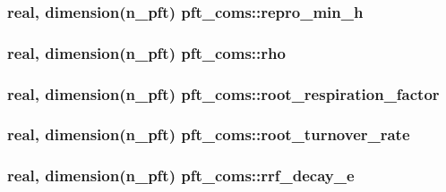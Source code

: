 \subsubsection[{repro\+\_\+min\+\_\+h}]{\setlength{\rightskip}{0pt plus 5cm}real, dimension(n\+\_\+pft) pft\+\_\+coms\+::repro\+\_\+min\+\_\+h}\label{namespacepft__coms_a30fe0a0ce90033d81e78cc82c9b70017}
\hypertarget{namespacepft__coms_aec4095886699dcf26ce469d85c675ed5}{}
\subsubsection[{rho}]{\setlength{\rightskip}{0pt plus 5cm}real, dimension(n\+\_\+pft) pft\+\_\+coms\+::rho}\label{namespacepft__coms_aec4095886699dcf26ce469d85c675ed5}
\hypertarget{namespacepft__coms_a3bc4fe17b80e40b1224d3e46d9699a66}{}
\subsubsection[{root\+\_\+respiration\+\_\+factor}]{\setlength{\rightskip}{0pt plus 5cm}real, dimension(n\+\_\+pft) pft\+\_\+coms\+::root\+\_\+respiration\+\_\+factor}\label{namespacepft__coms_a3bc4fe17b80e40b1224d3e46d9699a66}
\hypertarget{namespacepft__coms_a99860b135721c9298c4a28c8eeaab425}{}
\subsubsection[{root\+\_\+turnover\+\_\+rate}]{\setlength{\rightskip}{0pt plus 5cm}real, dimension(n\+\_\+pft) pft\+\_\+coms\+::root\+\_\+turnover\+\_\+rate}\label{namespacepft__coms_a99860b135721c9298c4a28c8eeaab425}
\hypertarget{namespacepft__coms_a2087ec09afb37705591b08017b2bcb27}{}
\subsubsection[{rrf\+\_\+decay\+\_\+e}]{\setlength{\rightskip}{0pt plus 5cm}real, dimension(n\+\_\+pft) pft\+\_\+coms\+::rrf\+\_\+decay\+\_\+e}\label{namespacepft__coms_a2087ec09afb37705591b08017b2bcb27}
\hypertarget{namespacepft__coms_ae05300b2ffecef7671154f099c69e0bb}{}
